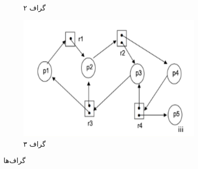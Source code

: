 \begin{figure}[h]
\begin{subfigure}[b]{0.3\textwidth}
		\caption{گراف ۲}
		\label{شکل۱ ب}
	\end{subfigure}
	\hfill
	\begin{subfigure}[b]{0.3\textwidth}
		\centering
		\includegraphics[width=\textwidth]{pics/img3.png}
		\caption{گراف ۳}
		\label{شکل۱ ج}
	\end{subfigure}
	\caption{گراف‌ها}
	\label{شکل ۱}
\end{figure}








	
%		
%		
%		
%		
%		
%		
%		
%		
%		
%		
%		
%		

